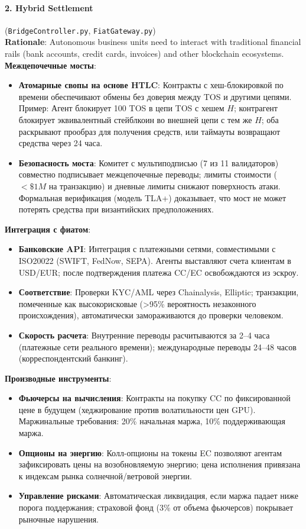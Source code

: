 \documentclass[11pt]{article}
\begin{document}
\paragraph{2. Hybrid Settlement} (\texttt{BridgeController.py}, \texttt{FiatGateway.py})\\
\textbf{Rationale}: Autonomous business units need to interact with traditional financial rails (bank accounts, credit cards, invoices) and other blockchain ecosystems.\\
\textbf{Межцепочечные мосты}:
\begin{itemize}[noitemsep]
  \item \textbf{Атомарные свопы на основе HTLC}: Контракты с хеш-блокировкой по времени обеспечивают обмены без доверия между TOS и другими цепями. Пример: Агент блокирует 100 TOS в цепи TOS с хешем $H$; контрагент блокирует эквивалентный стейблкоин во внешней цепи с тем же $H$; оба раскрывают прообраз для получения средств, или таймауты возвращают средства через 24 часа.
  \item \textbf{Безопасность моста}: Комитет с мультиподписью (7 из 11 валидаторов) совместно подписывает межцепочечные переводы; лимиты стоимости ($<\$1M$ на транзакцию) и дневные лимиты снижают поверхность атаки. Формальная верификация (модель TLA+) доказывает, что мост не может потерять средства при византийских предположениях.
\end{itemize}
\textbf{Интеграция с фиатом}:
\begin{itemize}[noitemsep]
  \item \textbf{Банковские API}: Интеграция с платежными сетями, совместимыми с ISO20022 (SWIFT, FedNow, SEPA). Агенты выставляют счета клиентам в USD/EUR; после подтверждения платежа CC/EC освобождаются из эскроу.
  \item \textbf{Соответствие}: Проверки KYC/AML через Chainalysis, Elliptic; транзакции, помеченные как высокорисковые (>95\% вероятность незаконного происхождения), автоматически замораживаются до проверки человеком.
  \item \textbf{Скорость расчета}: Внутренние переводы расчитываются за 2--4 часа (платежные сети реального времени); международные переводы 24--48 часов (корреспондентский банкинг).
\end{itemize}
\textbf{Производные инструменты}:
\begin{itemize}[noitemsep]
  \item \textbf{Фьючерсы на вычисления}: Контракты на покупку CC по фиксированной цене в будущем (хеджирование против волатильности цен GPU). Маржинальные требования: 20\% начальная маржа, 10\% поддерживающая маржа.
  \item \textbf{Опционы на энергию}: Колл-опционы на токены EC позволяют агентам зафиксировать цены на возобновляемую энергию; цена исполнения привязана к индексам рынка солнечной/ветровой энергии.
  \item \textbf{Управление рисками}: Автоматическая ликвидация, если маржа падает ниже порога поддержания; страховой фонд (3\% от объема фьючерсов) покрывает рыночные нарушения.
\end{itemize}
\end{document}
